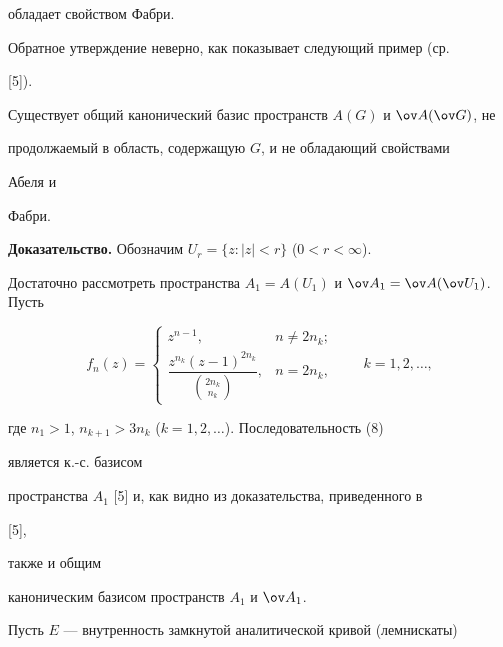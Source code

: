 обладает свойством Фабри. 


 


Обратное утверждение неверно, как показывает следующий пример (ср. 


[5]). 


 


\begin{thm} 


Существует общий канонический базис пространств $A(G)$ и $\ov A(\ov 


G)$, не 


продолжаемый в область, содержащую $G$, и не обладающий свойствами 


Абеля и 


Фабри. 


\end{thm} 


 


{\bf Доказательство.} Обозначим $U_r=\{z:|z|<r\}$ ($0<r<\infty$). 


Достаточно рассмотреть пространства $A_1=A(U_1)$ и $\ov A_1=\ov A(\ov 


U_1)$. Пусть 


\begin{equation} 


f_n(z)= 


\begin{cases} 


z^{n-1}, & n\ne 2n_k;\\ 


\dfrac{z^{n_k}(z-1)^{2n_k}}{\binom{2n_k}{n_k}}, & n=2n_k, 


\end{cases} 


\qquad k=1,2,\dotsc, 


\end{equation} 


где $n_1>1$, $n_{k+1}>3n_k$ ($k=1,2,\dotsc$). Последовательность (8) 


является к.-с. базисом 


пространства $A_1$ [5] и, как видно из доказательства, приведенного в 


[5], 


также и общим 


каноническим базисом пространств $A_1$ и $\ov A_1$. 


Пусть $E$ --- внутренность замкнутой аналитической кривой (лемнискаты) 


